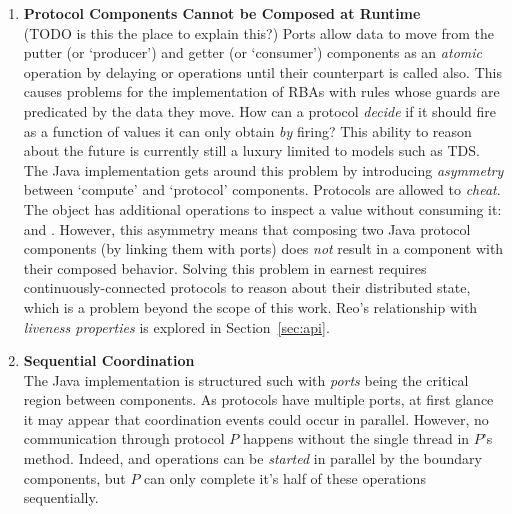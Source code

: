 \begin{enumerate}
	\item \textbf{Protocol Components Cannot be Composed at Runtime}\\
	(TODO is this the place to explain this?)
	Ports allow data to move from the putter (or `producer') and getter (or `consumer') components as an \textit{atomic} operation by delaying  or  operations until their counterpart is called also. This causes problems for the implementation of RBAs with rules whose guards are predicated by the data they move. How can a protocol \textit{decide} if it should fire as a function of values it can only obtain \textit{by} firing? This ability to reason about the future is currently still a luxury limited to models such as TDS. The Java implementation gets around this problem by introducing \textit{asymmetry} between `compute' and `protocol' components. Protocols are allowed to \textit{cheat}. The  object has additional operations to inspect a value without consuming it:  and . However, this asymmetry means that composing two Java protocol components (by linking them with ports) does \textit{not} result in a component with their composed behavior. Solving this problem in earnest requires continuously-connected protocols to reason about their distributed state, which is a problem beyond the scope of this work. Reo's relationship with \textit{liveness properties} is explored in Section~\ref{sec:api}.
	
	\item \textbf{Sequential Coordination}\\
	The Java implementation is structured such with \textit{ports} being the critical region between components. As protocols have multiple ports, at first glance it may appear that coordination events could occur in parallel. However, no communication through protocol $P$ happens without the single thread in $P$'s  method. Indeed,  and  operations can be \textit{started} in parallel by the boundary components, but $P$ can only complete it's half of these operations sequentially.
	
\end{enumerate}

